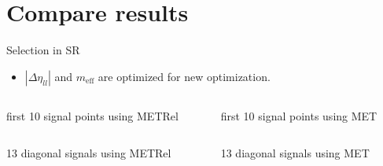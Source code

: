\documentclass[mathserif,serif]{beamer}
\begin{document}
\section{Compare results}
\begin{frame}{Selection in SR}
\tiny
\begin{itemize}
\item $|\Delta\eta_{ll}|$ and $m_{\text{eff}}$ are optimized for new optimization.
\end{itemize}

\begin{table}[htbp]
\centering
\tiny

\begin{columns}

\begin{column}{0.5\textwidth}
\scalebox{0.8}{

\end{tabular}
}
\caption{\tiny first 10 signal points using METRel}
\end{column}

\begin{column}{0.5\textwidth}
\scalebox{0.8}{

\end{tabular}
}
\caption{\tiny first 10 signal points using MET}
\end{column}

\end{columns}

\begin{columns}

\begin{column}{0.5\textwidth}
\scalebox{0.8}{

\end{tabular}
}
\caption{\tiny 13 diagonal signals using METRel}
\end{column}

\begin{column}{0.5\textwidth}
\scalebox{0.8}{

\end{tabular}
}
\caption{\tiny 13 diagonal signals using MET}
\end{column}

\end{columns}
\end{table}
\end{frame}
\end{document}
